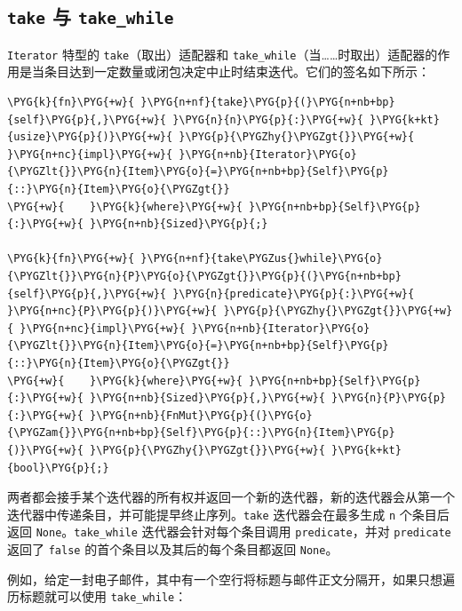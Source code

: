 \subsection{\texttt{take} 与 \texttt{take\_while}}

\texttt{Iterator} 特型的 \texttt{take}（取出）适配器和 \texttt{take\_while}（当……时取出）适配器的作用是当条目达到一定数量或闭包决定中止时结束迭代。它们的签名如下所示：

\begin{Verbatim}[commandchars=\\\{\},breaklines=true,breakanywhere=true,fontsize=\codefont,xleftmargin=17bp]
\PYG{k}{fn}\PYG{+w}{ }\PYG{n+nf}{take}\PYG{p}{(}\PYG{n+nb+bp}{self}\PYG{p}{,}\PYG{+w}{ }\PYG{n}{n}\PYG{p}{:}\PYG{+w}{ }\PYG{k+kt}{usize}\PYG{p}{)}\PYG{+w}{ }\PYG{p}{\PYGZhy{}\PYGZgt{}}\PYG{+w}{ }\PYG{n+nc}{impl}\PYG{+w}{ }\PYG{n+nb}{Iterator}\PYG{o}{\PYGZlt{}}\PYG{n}{Item}\PYG{o}{=}\PYG{n+nb+bp}{Self}\PYG{p}{::}\PYG{n}{Item}\PYG{o}{\PYGZgt{}}
\PYG{+w}{    }\PYG{k}{where}\PYG{+w}{ }\PYG{n+nb+bp}{Self}\PYG{p}{:}\PYG{+w}{ }\PYG{n+nb}{Sized}\PYG{p}{;}

\PYG{k}{fn}\PYG{+w}{ }\PYG{n+nf}{take\PYGZus{}while}\PYG{o}{\PYGZlt{}}\PYG{n}{P}\PYG{o}{\PYGZgt{}}\PYG{p}{(}\PYG{n+nb+bp}{self}\PYG{p}{,}\PYG{+w}{ }\PYG{n}{predicate}\PYG{p}{:}\PYG{+w}{ }\PYG{n+nc}{P}\PYG{p}{)}\PYG{+w}{ }\PYG{p}{\PYGZhy{}\PYGZgt{}}\PYG{+w}{ }\PYG{n+nc}{impl}\PYG{+w}{ }\PYG{n+nb}{Iterator}\PYG{o}{\PYGZlt{}}\PYG{n}{Item}\PYG{o}{=}\PYG{n+nb+bp}{Self}\PYG{p}{::}\PYG{n}{Item}\PYG{o}{\PYGZgt{}}
\PYG{+w}{    }\PYG{k}{where}\PYG{+w}{ }\PYG{n+nb+bp}{Self}\PYG{p}{:}\PYG{+w}{ }\PYG{n+nb}{Sized}\PYG{p}{,}\PYG{+w}{ }\PYG{n}{P}\PYG{p}{:}\PYG{+w}{ }\PYG{n+nb}{FnMut}\PYG{p}{(}\PYG{o}{\PYGZam{}}\PYG{n+nb+bp}{Self}\PYG{p}{::}\PYG{n}{Item}\PYG{p}{)}\PYG{+w}{ }\PYG{p}{\PYGZhy{}\PYGZgt{}}\PYG{+w}{ }\PYG{k+kt}{bool}\PYG{p}{;}
\end{Verbatim}

两者都会接手某个迭代器的所有权并返回一个新的迭代器，新的迭代器会从第一个迭代器中传递条目，并可能提早终止序列。\texttt{take} 迭代器会在最多生成 \texttt{n} 个条目后返回 \texttt{None}。\texttt{take\_while} 迭代器会针对每个条目调用 \texttt{predicate}，并对 \texttt{predicate} 返回了 \texttt{false} 的首个条目以及其后的每个条目都返回 \texttt{None}。

例如，给定一封电子邮件，其中有一个空行将标题与邮件正文分隔开，如果只想遍历标题就可以使用 \texttt{take\_while}：

